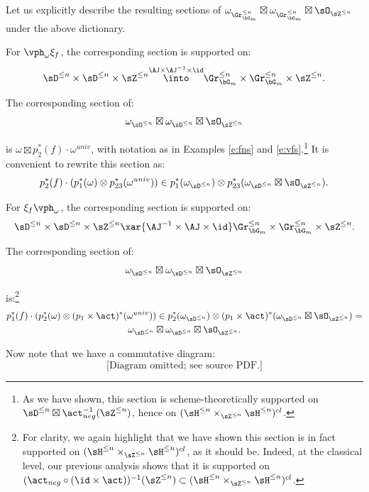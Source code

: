 Let us explicitly describe the resulting sections of
$\omega_{\Gr_{\bG_m}^{\leq n}} \boxtimes \omega_{\Gr_{\bG_m}^{\leq n}}
\boxtimes \sO_{\sZ^{\leq n}}$ under the
above dictionary.

For $\vph_{\omega}\xi_f$, the corresponding section
is supported on:
%
\[
\sD^{\leq n} \times \sD^{\leq n} \times \sZ^{\leq n}
\overset{\AJ \times \AJ^{-1} \times \id}{\into}
\Gr_{\bG_m}^{\leq n} \times \Gr_{\bG_m}^{\leq n}
\times \sZ^{\leq n}.
\]

 The corresponding section of:
%
\[
\omega_{\sD^{\leq n}} \boxtimes
\omega_{\sD^{\leq n}} \boxtimes \sO_{\sZ^{\leq n}}
\]

 is $\omega \boxtimes p_2^*(f)\cdot\omega^{univ}$,
with notation as in Examples \ref{e:fns} and \ref{e:vfs}.\footnote{As
we have shown, this section is scheme-theoretically supported
on $\sD^{\leq n} \boxtimes \act_{neg}^{-1}(\sZ^{\leq n})$,
hence on $(\sH^{\leq n} \times_{\sZ^{\leq n}}\sH^{\leq n})^{cl}$.} It is convenient to
rewrite this section as:
%
\[
p_2^*(f) \cdot (p_1^*(\omega) \otimes p_{23}^*(\omega^{univ})) \in
p_1^*(\omega_{\sD^{\leq n}}) \otimes
p_{23}^*(\omega_{\sD^{\leq n}} \boxtimes \sO_{\sZ^{\leq n}}).
\]

For $\xi_f\vph_{\omega}$, the corresponding section
is supported on:
%
\[
\sD^{\leq n} \times \sD^{\leq n} \times \sZ^{\leq n}
\xar{\AJ^{-1} \times \AJ \times \id}
\Gr_{\bG_m}^{\leq n} \times \Gr_{\bG_m}^{\leq n}
\times \sZ^{\leq n}.
\]

 The corresponding section of:
%
\[
\omega_{\sD^{\leq n}} \boxtimes
\omega_{\sD^{\leq n}} \boxtimes \sO_{\sZ^{\leq n}}
\]

 is:\footnote{For clarity, we again
highlight that we have shown
this section is in fact supported on
$(\sH^{\leq n} \times_{\sZ^{\leq n}}\sH^{\leq n})^{cl}$, as
it should be. Indeed, at the classical level, our previous
analysis shows that it is
supported on
$(\act_{neg}\circ (\id\times\act))^{-1} (\sZ^{\leq n})
\subset  (\sH^{\leq n} \times_{\sZ^{\leq n}}\sH^{\leq n})^{cl}$.}
%
\[
\begin{gathered}
p_1^*(f) \cdot
(p_2^*(\omega) \otimes (p_1\times \act)^*(\omega^{univ})) \in
p_2^*(\omega_{\sD^{\leq n}}) \otimes
(p_1\times \act)^*(\omega_{\sD^{\leq n}} \boxtimes \sO_{\sZ^{\leq n}}) = \\
\omega_{\sD^{\leq n}} \boxtimes \omega_{\sD^{\leq n}}
\boxtimes \sO_{\sZ^{\leq n}}.
\end{gathered}
\]

Now note that we have a commutative diagram:
%
\[
\text{[Diagram omitted; see source PDF.]}
\]

